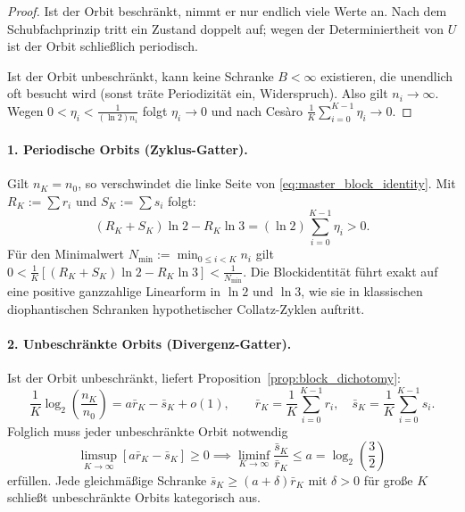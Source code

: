 \documentclass[11pt,reqno]{amsart}
\theoremstyle{definition}
\theoremstyle{remark}
\numberwithin{equation}{section}
\begin{document}
\begin{proof}
Ist der Orbit beschränkt, nimmt er nur endlich viele Werte an. Nach dem Schubfachprinzip tritt ein Zustand doppelt auf; wegen der Determiniertheit von $U$ ist der Orbit schließlich periodisch.

Ist der Orbit unbeschränkt, kann keine Schranke $B < \infty$ existieren, die unendlich oft besucht wird (sonst träte Periodizität ein, Widerspruch). Also gilt $n_i \to \infty$. Wegen $0 < \eta_i < \frac{1}{(\ln 2) n_i}$ folgt $\eta_i \to 0$ und nach Cesàro $\frac{1}{K} \sum_{i=0}^{K-1} \eta_i \to 0$.
\end{proof}

\paragraph{1. Periodische Orbits (Zyklus-Gatter).}
Gilt $n_K = n_0$, so verschwindet die linke Seite von \eqref{eq:master_block_identity}. Mit $R_K := \sum r_i$ und $S_K := \sum s_i$ folgt:
\begin{equation}
(R_K + S_K) \ln 2 - R_K \ln 3 = (\ln 2) \sum_{i=0}^{K-1} \eta_i > 0.
\end{equation}
Für den Minimalwert $N_{\min} := \min_{0 \le i < K} n_i$ gilt $0 < \frac{1}{K} \left[ (R_K + S_K) \ln 2 - R_K \ln 3 \right] < \frac{1}{N_{\min}}$. 
Die Blockidentität führt exakt auf eine positive ganzzahlige Linearform in $\ln 2$ und $\ln 3$, wie sie in klassischen diophantischen Schranken hypothetischer Collatz-Zyklen auftritt.

\paragraph{2. Unbeschränkte Orbits (Divergenz-Gatter).}
Ist der Orbit unbeschränkt, liefert Proposition~\ref{prop:block_dichotomy}:
\begin{equation}
\frac{1}{K} \log_2\left(\frac{n_K}{n_0}\right) = a \bar{r}_K - \bar{s}_K + o(1), \qquad \bar{r}_K = \frac{1}{K}\sum_{i=0}^{K-1} r_i, \quad \bar{s}_K = \frac{1}{K}\sum_{i=0}^{K-1} s_i.
\end{equation}
Folglich muss jeder unbeschränkte Orbit notwendig
\begin{equation}
\limsup_{K \to \infty} \left[ a \bar{r}_K - \bar{s}_K \right] \ge 0 \implies \liminf_{K \to \infty} \frac{\bar{s}_K}{\bar{r}_K} \le a = \log_2\left(\frac{3}{2}\right)
\end{equation}
erfüllen. Jede gleichmäßige Schranke $\bar{s}_K \ge (a + \delta) \bar{r}_K$ mit $\delta > 0$ für große $K$ schließt unbeschränkte Orbits kategorisch aus.
\end{document}
